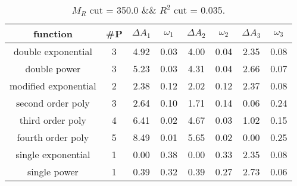  
\begin{table}[H] 
\begin{center} 
\begin{tabular}{|c|c|cc|cc|cc|} 
\hline function & \#P & $\Delta A_1$ & $\omega_1$ & $\Delta A_2$ & $\omega_2$ & $\Delta A_3$ & $\omega_3$ \\ \hline 
double exponential &  3 &   4.92 &   0.03 &   4.00 &   0.04 &   2.35 &   0.08 \\ 
double power &  3 &   5.23 &   0.03 &   4.31 &   0.04 &   2.66 &   0.07 \\ 
modified exponential &  2 &   2.38 &   0.12 &   2.02 &   0.12 &   2.37 &   0.08 \\ 
second order poly &  3 &   2.64 &   0.10 &   1.71 &   0.14 &   0.06 &   0.24 \\ 
third order poly &  4 &   6.41 &   0.02 &   4.67 &   0.03 &   1.02 &   0.15 \\ 
fourth order poly &  5 &   8.49 &   0.01 &   5.65 &   0.02 &   0.00 &   0.25 \\ 
single exponential &  1 &   0.00 &   0.38 &   0.00 &   0.33 &   2.35 &   0.08 \\ 
single power &  1 &   0.39 &   0.32 &   0.39 &   0.27 &   2.73 &   0.06 \\ 
\hline 
\end{tabular} 
\caption{$M_R$ cut = 350.0 \&\& $R^2$ cut = 0.035.} 
\label{tab:FitChoices_350.0_0.035} 
\end{center} 
\end{table} 
 
 

